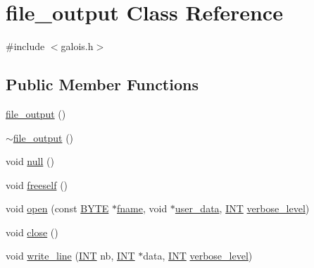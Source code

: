 \hypertarget{classfile__output}{}\section{file\+\_\+output Class Reference}
\label{classfile__output}


{\ttfamily \#include $<$galois.\+h$>$}

\subsection*{Public Member Functions}
\begin{DoxyCompactItemize}
\item 
\mbox{\hyperlink{classfile__output_ad861cad91b36cfb40938d33f1e24a0e7}{file\+\_\+output}} ()
\item 
\mbox{\hyperlink{classfile__output_ad95864cb7ef7ca6e6ee6a4b17c9f2adb}{$\sim$file\+\_\+output}} ()
\item 
void \mbox{\hyperlink{classfile__output_a533ca0160e5dea028b4022c04ca150f9}{null}} ()
\item 
void \mbox{\hyperlink{classfile__output_aaedcbfbac16ba9327db4d77bb5f0c180}{freeself}} ()
\item 
void \mbox{\hyperlink{classfile__output_a97b70b3bf28bc029b27d3c4f61a5e6ed}{open}} (const \mbox{\hyperlink{galois_8h_ab6cc7b4aeb6ea31aba2b3fbfc83ff5e6}{B\+Y\+TE}} $\ast$\mbox{\hyperlink{classfile__output_acc70b107edd9ffbf93008d2de83274e5}{fname}}, void $\ast$\mbox{\hyperlink{classfile__output_a7337cf9663a3cecb88dd03229a6356a6}{user\+\_\+data}}, \mbox{\hyperlink{galois_8h_a09fddde158a3a20bd2dcadb609de11dc}{I\+NT}} \mbox{\hyperlink{simeon_8_c_a818073fbcc2f439e7c56952f67386122}{verbose\+\_\+level}})
\item 
void \mbox{\hyperlink{classfile__output_a9b85121967f7cd6537707f57140a6f4e}{close}} ()
\item 
void \mbox{\hyperlink{classfile__output_a22e94c8e7a9da6d3cea1f65b2e0a891c}{write\+\_\+line}} (\mbox{\hyperlink{galois_8h_a09fddde158a3a20bd2dcadb609de11dc}{I\+NT}} nb, \mbox{\hyperlink{galois_8h_a09fddde158a3a20bd2dcadb609de11dc}{I\+NT}} $\ast$data, \mbox{\hyperlink{galois_8h_a09fddde158a3a20bd2dcadb609de11dc}{I\+NT}} \mbox{\hyperlink{simeon_8_c_a818073fbcc2f439e7c56952f67386122}{verbose\+\_\+level}})
\end{DoxyCompactItemize}

